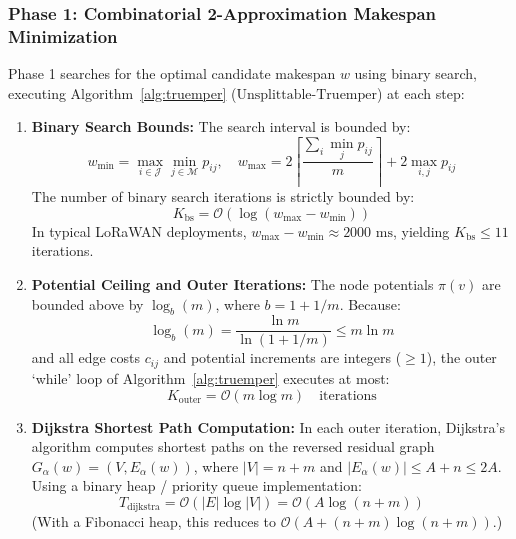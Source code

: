 \documentclass{article}
\begin{document}
\subsubsection{Phase 1: Combinatorial 2-Approximation Makespan Minimization}
Phase 1 searches for the optimal candidate makespan $w$ using binary search, executing Algorithm~\ref{alg:truemper} ($\text{Unsplittable-Truemper}$) at each step:
\begin{enumerate}
    \item \textbf{Binary Search Bounds:} The search interval is bounded by:
    \begin{equation}
    w_{\min} = \max_{i \in \mathcal{J}} \min_{j \in \mathcal{M}} p_{ij}, \quad w_{\max} = 2 \left\lceil \frac{\sum_i \min_j p_{ij}}{m} \right\rceil + 2 \max_{i, j} p_{ij}
    \end{equation}
    The number of binary search iterations is strictly bounded by:
    \begin{equation}
    K_{\text{bs}} = \mathcal{O}\left(\log(w_{\max} - w_{\min})\right)
    \end{equation}
    In typical LoRaWAN deployments, $w_{\max} - w_{\min} \approx 2000\text{ ms}$, yielding $K_{\text{bs}} \le 11$ iterations.

    \item \textbf{Potential Ceiling and Outer Iterations:} The node potentials $\pi(v)$ are bounded above by $\log_b(m)$, where $b = 1 + 1/m$. Because:
    \begin{equation}
    \log_b(m) = \frac{\ln m}{\ln(1 + 1/m)} \le m \ln m
    \end{equation}
    and all edge costs $c_{ij}$ and potential increments are integers ($\ge 1$), the outer `while' loop of Algorithm~\ref{alg:truemper} executes at most:
    \begin{equation}
    K_{\text{outer}} = \mathcal{O}(m \log m) \quad \text{iterations}
    \end{equation}

    \item \textbf{Dijkstra Shortest Path Computation:} In each outer iteration, Dijkstra's algorithm computes shortest paths on the reversed residual graph $G_\alpha(w) = (V, E_\alpha(w))$, where $|V| = n + m$ and $|E_\alpha(w)| \le A + n \le 2A$. Using a binary heap / priority queue implementation:
    \begin{equation}
    T_{\text{dijkstra}} = \mathcal{O}\left(|E| \log |V|\right) = \mathcal{O}\left(A \log(n + m)\right)
    \end{equation}
    (With a Fibonacci heap, this reduces to $\mathcal{O}(A + (n + m) \log(n + m))$.)


\end{enumerate}
\end{document}
